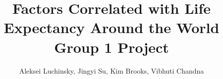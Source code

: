 \documentclass{article}
\begin{document}
\begin{titlepage}
\thispagestyle{empty}
\title{Factors Correlated with Life Expectancy Around the World\\
\large Group 1 Project}
\author{Aleksei Luchinsky, Jingyi Su, Kim Brooks, Vibhuti Chandna}
\date{}
\maketitle
\tableofcontents  
\end{titlepage}

\clearpage\newpage
\setcounter{page}{1}

\doublespacing 







\let\Section\section 
\def\section*#1{\Section{#1}} 


\end{document}
